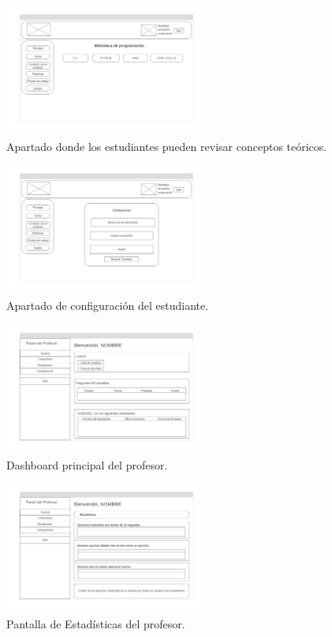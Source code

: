 \begin{figure}[H]
    \centering
    \includegraphics[width=0.6\textwidth]{imagenes/Mockups/9-Consulta-Teoria.png}
    \caption{Apartado donde los estudiantes pueden revisar conceptos teóricos.}
\end{figure}

\begin{figure}[H]
    \centering
    \includegraphics[width=0.6\textwidth]{imagenes/Mockups/10-Configuracion-Est-.png}
    \caption{Apartado de configuración del estudiante.}
\end{figure}

\begin{figure}[H]
    \centering
    \includegraphics[width=0.6\textwidth]{imagenes/Mockups/11-Profesor-Principal.png}
    \caption{Dashboard principal del profesor.}
\end{figure}

\begin{figure}[H]
    \centering
    \includegraphics[width=0.6\textwidth]{imagenes/Mockups/12-Profesor-Estadisticas.png}
    \caption{Pantalla de Estadísticas del profesor.}
\end{figure}

